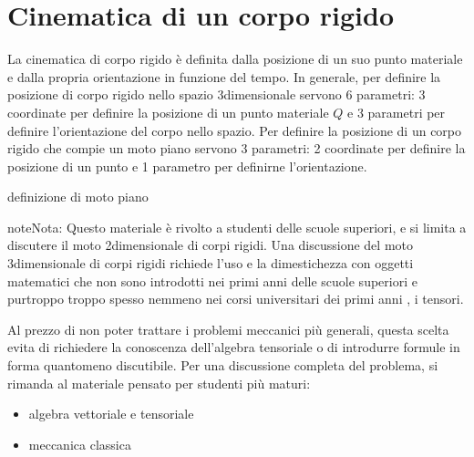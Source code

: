 \documentclass[letterpaper,10pt,italian]{jupyterBook}
\begin{document}
\sphinxstepscope




\section{Cinematica di un corpo rigido}
\label{\detokenize{ch/mechanics/kinematics-rigid:cinematica-di-un-corpo-rigido}}\label{\detokenize{ch/mechanics/kinematics-rigid:physics-hs-mechanics-kinematics-rigid}}\label{\detokenize{ch/mechanics/kinematics-rigid::doc}}
\sphinxAtStartPar
La cinematica di corpo rigido è definita dalla posizione di un suo punto materiale e dalla propria orientazione in funzione del tempo. In generale, per definire la posizione di corpo rigido nello spazio 3\sphinxhyphen{}dimensionale servono 6 parametri: 3 coordinate per definire la posizione di un punto materiale \(Q\) e 3 parametri per definire l’orientazione del corpo nello spazio. Per definire la posizione di un corpo rigido che compie un moto piano servono 3 parametri: 2 coordinate per definire la posizione di un punto e 1 parametro per definirne l’orientazione.

\sphinxAtStartPar
{} definizione di moto piano

\begin{sphinxadmonition}{note}{Nota:}
\sphinxAtStartPar
Questo materiale è rivolto a studenti delle scuole superiori, e si limita a discutere il moto 2\sphinxhyphen{}dimensionale di corpi rigidi. Una discussione del moto 3\sphinxhyphen{}dimensionale di corpi rigidi richiede l’uso e la dimestichezza con oggetti matematici che non sono introdotti nei primi anni delle scuole superiori \sphinxhyphen{} e purtroppo troppo spesso nemmeno nei corsi universitari dei primi anni \sphinxhyphen{}, i tensori.

\sphinxAtStartPar
Al prezzo di non poter trattare i problemi meccanici più generali, questa scelta evita di richiedere la conoscenza dell’algebra tensoriale o di introdurre formule in forma quantomeno discutibile. Per una discussione completa del problema, si rimanda al materiale pensato per studenti più maturi: 
\begin{itemize}
\item {} 
\sphinxAtStartPar
algebra vettoriale e tensoriale 

\item {} 
\sphinxAtStartPar
meccanica classica 

\end{itemize}
\end{sphinxadmonition}
\end{document}
